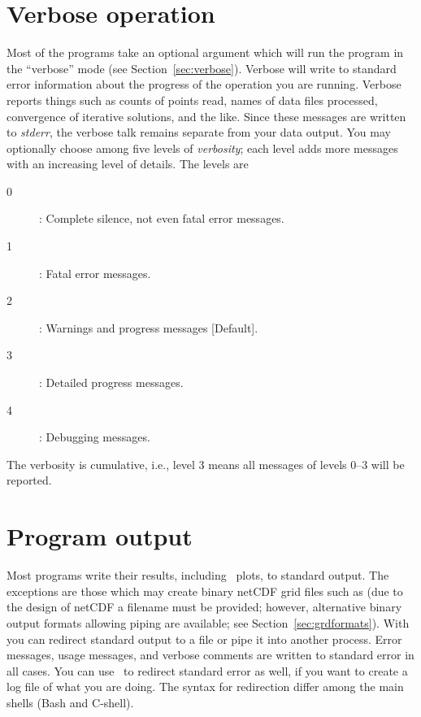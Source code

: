 \section{Verbose operation}

Most of the programs take an optional  argument
which will run the program in the ``verbose'' mode (see Section~\ref{sec:verbose}).
Verbose will write to standard error information about the progress
of the operation you are running.  Verbose reports things
such as counts of points read, names of data files
processed, convergence of iterative solutions, and the like.
Since these messages are written to \emph{stderr},  the
verbose talk remains separate from your data output.
You may optionally choose among five levels of \emph{verbosity}; each level
adds more messages with an increasing level of details.  The levels are
\begin{description}
	\item [0]: Complete silence, not even fatal error messages.
	\item [1]: Fatal error messages.
	\item [2]: Warnings and progress messages [Default].
	\item [3]: Detailed progress messages.
	\item [4]: Debugging messages.
\end{description}
The verbosity is cumulative, i.e., level 3 means all messages of levels 0--3
will be reported.

\section{Program output}

Most programs write their results, including \PS\
plots, to standard output.  The exceptions are those which may
create binary netCDF grid files such as  (due to
the design of netCDF a filename must be provided; however,
alternative binary output formats allowing piping are available; see Section~\ref{sec:grdformats}).
With \UNIX\, you can redirect standard output to a file or pipe it
into another process.  Error messages, usage messages, and
verbose comments are written to standard error in all cases.
You can use \UNIX\ to redirect standard error as well,
if you want to create a log file of what you are doing.
The syntax for redirection differ among the main shells (Bash and C-shell).

